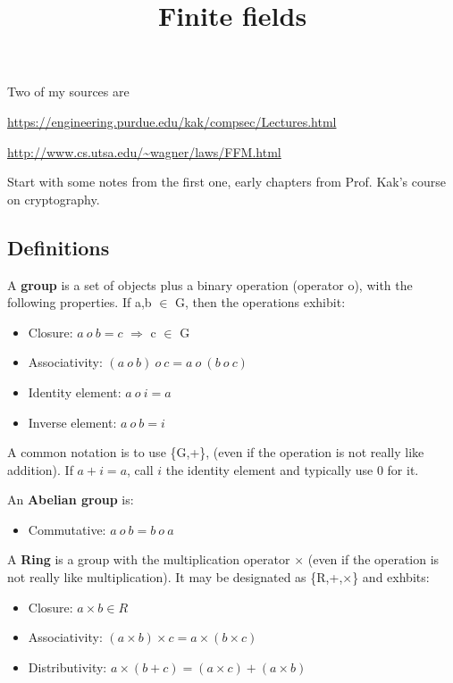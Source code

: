 \documentclass[11pt, oneside]{article}
\title{Finite fields}
\date{}
\begin{document}
\maketitle

\Large

Two of my sources are

\url{https://engineering.purdue.edu/kak/compsec/Lectures.html}

\url{http://www.cs.utsa.edu/~wagner/laws/FFM.html}

Start with some notes from the first one, early chapters from Prof. Kak's course on cryptography.

\subsection*{Definitions}

A \textbf{group} is a set of objects plus a binary operation (operator o), with the following properties.  If a,b $\in$ G, then the operations exhibit:

\begin{itemize}
\item Closure:           $a \ o \ b = c$ $\Rightarrow$ c $\in$ G
\item Associativity:    $(a \ o \ b) \ o \ c = a \ o \ (b \ o \ c)$
\item Identity element:  $a \ o \ i = a$
\item Inverse element:   $a \ o \ b = i$
\end{itemize}

A common notation is to use \{G,+\}, (even if the operation is not really like addition).  If $a + i = a$, call $i$ the identity element and typically use $0$ for it.

An \textbf{Abelian group} is:
\begin{itemize}
\item Commutative:       $a \ o \ b = b \ o \ a$
\end{itemize}

A \textbf{Ring} is a group with the multiplication operator $\times$ (even if the operation is not really like multiplication).  It may be designated as \{R,+,$\times$\} and exhbits:
\begin{itemize}
\item Closure:           $a \times b \in R$
\item Associativity:     $(a \times b) \times c = a \times (b \times c)$
\item Distributivity:    $a \times (b + c) = (a \times c) + (a \times b)$
\end{itemize}
\end{document}
